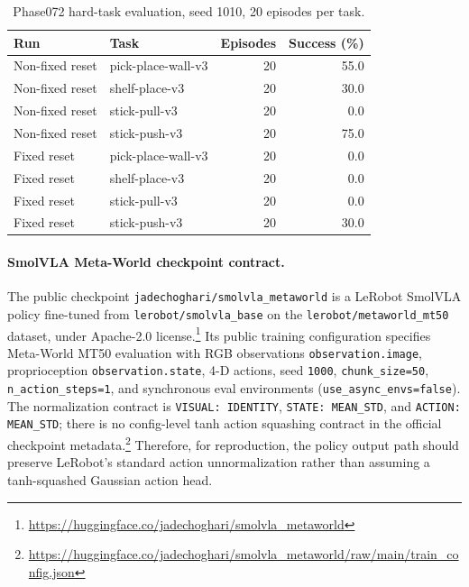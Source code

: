 \documentclass{article}
\begin{document}
\begin{table}[h]
\centering
\begin{tabular}{l l r r}
\hline
Run & Task & Episodes & Success (\%) \\
\hline
Non-fixed reset & pick-place-wall-v3 & 20 & 55.0 \\
Non-fixed reset & shelf-place-v3 & 20 & 30.0 \\
Non-fixed reset & stick-pull-v3 & 20 & 0.0 \\
Non-fixed reset & stick-push-v3 & 20 & 75.0 \\
\hline
Fixed reset & pick-place-wall-v3 & 20 & 0.0 \\
Fixed reset & shelf-place-v3 & 20 & 0.0 \\
Fixed reset & stick-pull-v3 & 20 & 0.0 \\
Fixed reset & stick-push-v3 & 20 & 30.0 \\
\hline
\end{tabular}
\caption{Phase072 hard-task evaluation, seed 1010, 20 episodes per task.}
\end{table}





\paragraph{SmolVLA Meta-World checkpoint contract.}
The public checkpoint \texttt{jadechoghari/smolvla\_metaworld} is a LeRobot SmolVLA policy fine-tuned from \texttt{lerobot/smolvla\_base} on the \texttt{lerobot/metaworld\_mt50} dataset, under Apache-2.0 license.\footnote{\url{https://huggingface.co/jadechoghari/smolvla_metaworld}}  Its public training configuration specifies Meta-World MT50 evaluation with RGB observations \texttt{observation.image}, proprioception \texttt{observation.state}, 4-D actions, seed \texttt{1000}, \texttt{chunk\_size=50}, \texttt{n\_action\_steps=1}, and synchronous eval environments (\texttt{use\_async\_envs=false}).  The normalization contract is \texttt{VISUAL: IDENTITY}, \texttt{STATE: MEAN\_STD}, and \texttt{ACTION: MEAN\_STD}; there is no config-level tanh action squashing contract in the official checkpoint metadata.\footnote{\url{https://huggingface.co/jadechoghari/smolvla_metaworld/raw/main/train_config.json}}  Therefore, for reproduction, the policy output path should preserve LeRobot's standard action unnormalization rather than assuming a tanh-squashed Gaussian action head.
\end{document}
